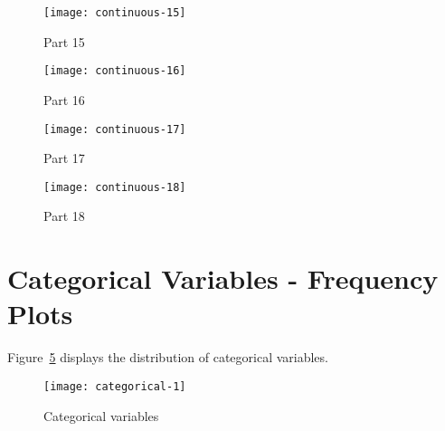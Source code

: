 \begin{figure}[ht]
    \begin{center}
    \texttt{[image: continuous-15]}
    \end{center}
    \caption{Part 15}
    \label{continuous-15}
\end{figure}

\begin{figure}[ht]
    \begin{center}
    \texttt{[image: continuous-16]}
    \end{center}
    \caption{Part 16}
    \label{continuous-16}
\end{figure}

\begin{figure}[ht]
    \begin{center}
    \texttt{[image: continuous-17]}
    \end{center}
    \caption{Part 17}
    \label{continuous-17}
\end{figure}

\begin{figure}[ht]
    \begin{center}
    \texttt{[image: continuous-18]}
    \end{center}
    \caption{Part 18}
    \label{continuous-18}
\end{figure}

\section{Categorical Variables - Frequency Plots}
\label{sec:categorical}
Figure~\ref{categorical} displays the distribution of categorical variables.
\begin{figure}[ht]
    \begin{center}
    \texttt{[image: categorical-1]}
    \end{center}
    \caption{Categorical variables}
    \label{categorical}
\end{figure}


